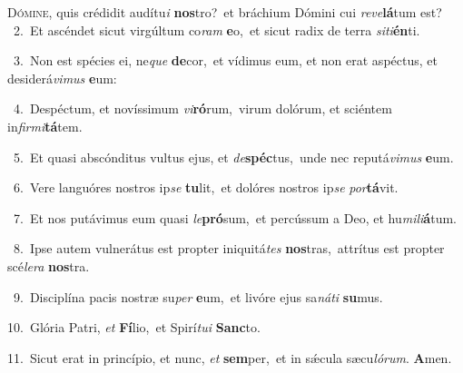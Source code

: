 \lettrine{\initial\textcolor{\initialcolor}{D}}{ómine,} quis crédidit audítu\textit{i} \textbf{nos}\-tro?~\star et bráchium Dómini cui \textit{re}\-\textit{ve}\textbf{lá}tum est?\\
{\numbfont\textcolor{\numbcolor}{~2.}}~Et ascéndet sicut virgúltum co\textit{ram} \textbf{e}\-o,~\star et sicut radix de terra \textit{si}\-\textit{ti}\textbf{én}ti.\par
{\numbfont\textcolor{\numbcolor}{~3.}}~Non est spécies ei, ne\textit{que} \textbf{de}\-cor,~\star et vídimus eum, et non erat aspéctus, et desiderá\-\textit{vi}\-\textit{mus} \textbf{e}\-um:\par
{\numbfont\textcolor{\numbcolor}{~4.}}~Despéctum, et novíssimum \textit{vi}\-\textbf{ró}rum,~\star virum dolórum, et sciéntem in\-\textit{fir}\-\textit{mi}\textbf{tá}tem.\par
{\numbfont\textcolor{\numbcolor}{~5.}}~Et quasi abscónditus vultus ejus, et \textit{de}\-\textbf{spéc}tus,~\star unde nec reputá\-\textit{vi}\-\textit{mus} \textbf{e}\-um.\par
{\numbfont\textcolor{\numbcolor}{~6.}}~Vere languóres nostros ip\textit{se} \textbf{tu}\-lit,~\star et dolóres nostros ip\textit{se} \textit{por}\-\textbf{tá}vit.\par
{\numbfont\textcolor{\numbcolor}{~7.}}~Et nos putávimus eum quasi \textit{le}\-\textbf{pró}sum,~\star et percússum a Deo, et hu\-\textit{mi}\-\textit{li}\textbf{á}tum.\par
{\numbfont\textcolor{\numbcolor}{~8.}}~Ipse autem vulnerátus est propter iniquitá\textit{tes} \textbf{nos}\-tras,~\star attrítus est propter scé\-\textit{le}\-\textit{ra} \textbf{nos}\-tra.\par
{\numbfont\textcolor{\numbcolor}{~9.}}~Disciplína pacis nostræ su\textit{per} \textbf{e}\-um,~\star et livóre ejus sa\-\textit{ná}\-\textit{ti} \textbf{su}\-mus.\par
{\numbfont\textcolor{\numbcolor}{10.}}~Glória Patri, \textit{et} \textbf{Fí}\-lio,~\star et Spirí\-\textit{tu}\-\textit{i} \textbf{Sanc}\-to.\par
{\numbfont\textcolor{\numbcolor}{11.}}~Sicut erat in princípio, et nunc, \textit{et} \textbf{sem}\-per,~\star et in sǽcula sæcu\-\textit{ló}\-\textit{rum}. \textbf{A}\-men.\par
